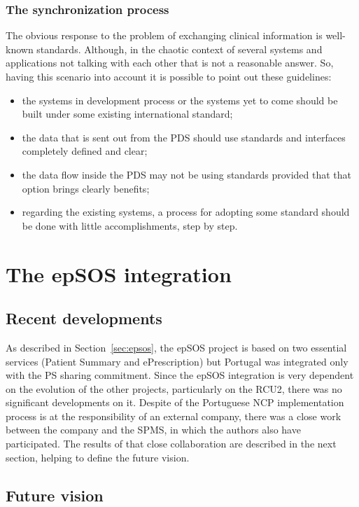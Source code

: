 \subsubsection{The synchronization process}

The obvious response to the problem of exchanging clinical information is well-known standards. Although, in the chaotic context of several systems and applications not talking with each other that is not a reasonable answer. So, having this scenario into account it is possible to point out these guidelines:
\begin{itemize}
\item the systems in development process or the systems yet to come should be built under some existing international standard;
\item the data that is sent out from the PDS should use standards and interfaces completely defined and clear;
\item the data flow inside the PDS may not be using standards provided that that option brings clearly benefits;
\item regarding the existing systems, a process for adopting some standard should be done with little accomplishments, step by step.
\end{itemize}



\section{The epSOS integration}

\subsection{Recent developments}

As described in Section~\ref{sec:epsos}, the epSOS project is based on two essential services (Patient Summary and ePrescription) but Portugal was integrated only with the PS sharing commitment. Since the epSOS integration is very dependent on the evolution of the other projects, particularly on the RCU2, there was no significant developments on it. Despite of the Portuguese NCP implementation process is at the responsibility of an external company, there was a close work between the company and the SPMS, in which the authors also have participated. The results of that close collaboration are described in the next section, helping to define the future vision.

\subsection{Future vision}

